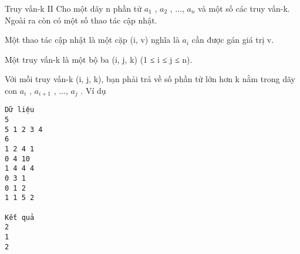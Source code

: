 Truy vấn-k II
Cho một dãy n phần tử $a_{1}$   ,   $a_{2}$   , ..., $a_{n}$   và một số các truy vấn-k. Ngoài ra còn có một số thao tác cập nhật.  

   Một thao tác cập nhật là một cặp (i, v) nghĩa là $a_{i}$   cần được gán giá trị v.  

   Một truy vấn-k là một bộ ba (i, j, k) (1 ≤ i ≤ j ≤ n).  

   Với mỗi truy vấn-k (i, j, k), bạn phải trả về số phần tử lớn hơn k nằm trong dãy con $a_{i}$   ,   $a_{i+1}$   , ..., $a_{j}$   .
Ví dụ
\begin{verbatim}
Dữ liệu
5
5 1 2 3 4
6
1 2 4 1
0 4 10
1 4 4 4
0 3 1
0 1 2
1 1 5 2  

Kết quả
2
1
2 
\end{verbatim}